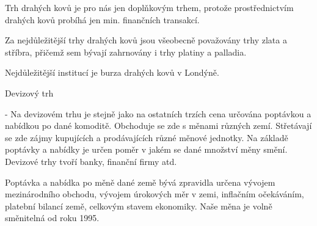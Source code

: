 Trh drahých kovů
je pro nás jen doplňkovým trhem, protože prostřednictvím drahých kovů probíhá jen min. finančních transakcí.

Za nejdůležitější trhy drahých kovů jsou všeobecně považovány trhy zlata a stříbra, přičemž sem bývají zahrnovány i
trhy platiny a palladia.

Nejdůležitější institucí je burza drahých kovů v Londýně.

Devizový trh

- Na devizovém trhu je stejně jako na ostatních trzích cena určována poptávkou a nabídkou po dané komoditě.
Obchoduje se zde s měnami různých zemí. Střetávají se zde zájmy kupujících a prodávajících různé měnové jednotky.
Na základě poptávky a nabídky je určen poměr v jakém se dané množství měny smění. Devizové trhy tvoří banky,
finanční firmy atd.

Poptávka a nabídka po měně dané země bývá zpravidla určena vývojem mezinárodního obchodu, vývojem úrokových
měr v zemi, inflačním očekáváním, platební bilancí země, celkovým stavem ekonomiky. Naše měna je volně směnitelná
od roku 1995.
\newpage